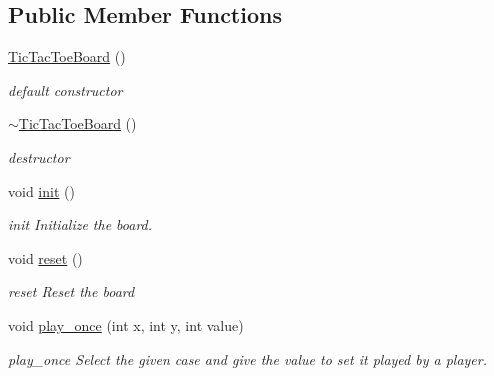 \subsection*{Public Member Functions}
\begin{DoxyCompactItemize}
\item 
\mbox{\label{class_tic_tac_toe_board_adff1ee9118b05338cba02ba1f0352236}} 
\hyperlink{class_tic_tac_toe_board_adff1ee9118b05338cba02ba1f0352236}{Tic\+Tac\+Toe\+Board} ()
\begin{DoxyCompactList}\small\item\em default constructor \end{DoxyCompactList}\item 
\mbox{\label{class_tic_tac_toe_board_a6d5ab5e2d86f603927c3fa34d2fc03fc}} 
\hyperlink{class_tic_tac_toe_board_a6d5ab5e2d86f603927c3fa34d2fc03fc}{$\sim$\+Tic\+Tac\+Toe\+Board} ()
\begin{DoxyCompactList}\small\item\em destructor \end{DoxyCompactList}\item 
\mbox{\label{class_tic_tac_toe_board_a1800dd3903d95e8cd0eba839fbb06319}} 
void \hyperlink{class_tic_tac_toe_board_a1800dd3903d95e8cd0eba839fbb06319}{init} ()
\begin{DoxyCompactList}\small\item\em init Initialize the board. \end{DoxyCompactList}\item 
\mbox{\label{class_tic_tac_toe_board_ab4e17ab271aaf248e569297979b56f7a}} 
void \hyperlink{class_tic_tac_toe_board_ab4e17ab271aaf248e569297979b56f7a}{reset} ()
\begin{DoxyCompactList}\small\item\em reset Reset the board \end{DoxyCompactList}\item 
void \hyperlink{class_tic_tac_toe_board_a59fbbb4e8c7fa5ba6e1cdc8c33c50fb5}{play\+\_\+once} (int x, int y, int value)
\begin{DoxyCompactList}\small\item\em play\+\_\+once Select the given case and give the value to set it played by a player. \end{DoxyCompactList}\item 

\end{DoxyCompactItemize}
